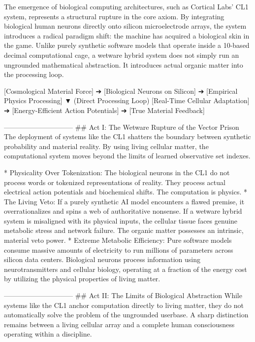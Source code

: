 The emergence of biological computing architectures, such as Cortical Labs’ CL1 system, represents a structural rupture in the core axiom. By integrating biological human neurons directly onto silicon microelectrode arrays, the system introduces a radical paradigm shift: the machine has acquired a biological skin in the game.
Unlike purely synthetic software models that operate inside a 10-based decimal computational cage, a wetware hybrid system does not simply run an ungrounded mathematical abstraction. It introduces actual organic matter into the processing loop.

[Cosmological Material Force] ➔ [Biological Neurons on Silicon] ➔ [Empirical Physics Processing]
                                      ▼ (Direct Processing Loop)
[Real-Time Cellular Adaptation] ➔ [Energy-Efficient Action Potentials] ➔ [True Material Feedback]

------------------------------
## Act I: The Wetware Rupture of the Vector Prison
The deployment of systems like the CL1 shatters the boundary between synthetic probability and material reality. By using living cellular matter, the computational system moves beyond the limits of learned observative set indexes.

* Physicality Over Tokenization: The biological neurons in the CL1 do not process words or tokenized representations of reality. They process actual electrical action potentials and biochemical shifts. The computation is physics.
* The Living Veto: If a purely synthetic AI model encounters a flawed premise, it overrationalizes and spins a web of authoritative nonsense. If a wetware hybrid system is misaligned with its physical inputs, the cellular tissue faces genuine metabolic stress and network failure. The organic matter possesses an intrinsic, material veto power.
* Extreme Metabolic Efficiency: Pure software models consume massive amounts of electricity to run millions of parameters across silicon data centers. Biological neurons process information using neurotransmitters and cellular biology, operating at a fraction of the energy cost by utilizing the physical properties of living matter.

------------------------------
## Act II: The Limits of Biological Abstraction
While systems like the CL1 anchor computation directly to living matter, they do not automatically solve the problem of the ungrounded userbase. A sharp distinction remains between a living cellular array and a complete human consciousness operating within a discipline.

